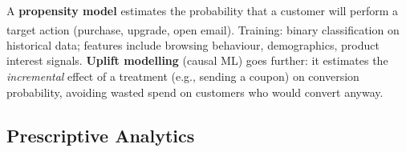 \begin{tcbitemize}[ skin=sectionraster ]
    \tcbitem[title=Propensity Models, raster multicolumn=3]
    A \textbf{propensity model} estimates the probability that a customer will perform a target action (purchase, upgrade, open email)\textsuperscript{\cite[][pp.~162--167]{chaffeyDigitalBusinessECommerce2019}}.
    Training: binary classification on historical data; features include browsing behaviour, demographics, product interest signals.
    \textbf{Uplift modelling} (causal ML) goes further: it estimates the \emph{incremental} effect of a treatment (e.g., sending a coupon) on conversion probability, avoiding wasted spend on customers who would convert anyway.

\end{tcbitemize}

\subsection{Prescriptive Analytics}

